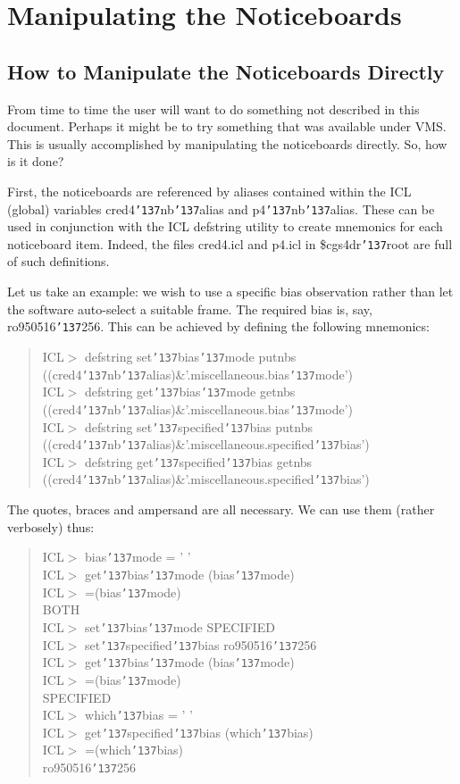 \documentclass[a4paper]{book}
\newcommand{\stardocinitials}  {SUN}
\newcommand{\stardocnumber}    {27.5}
\newcommand{\stardocname}{\stardocinitials /\stardocnumber}
\renewcommand{\_}{{\tt\char'137}}
\begin{document}
\chapter{Manipulating the Noticeboards}
\markboth{Behind the Scenes with NBS}{\stardocname}
\section{How to Manipulate the Noticeboards Directly}

From time to time the user will want to do something not described in
this document. Perhaps it might be to try something that was available
under VMS. This is usually accomplished by manipulating the
noticeboards directly.  So, how is it done?

First, the noticeboards are referenced by aliases contained within the
ICL (global) variables cred4\_nb\_alias and p4\_nb\_alias. These can be
used in conjunction with the ICL defstring utility to create mnemonics
for each noticeboard item. Indeed, the files cred4.icl and p4.icl in
{\sc \$cgs4dr\_root} are full of such definitions.

Let us take an example: we wish to use a specific {\sc bias}
observation rather than let the software auto-select a suitable frame.
The required {\sc bias} is, say, ro950516\_256. This can be achieved by
defining the following mnemonics:

\begin{quote}
 ICL$>$ defstring set\_bias\_mode putnbs ((cred4\_nb\_alias)\&'.miscellaneous.bias\_mode') \\
 ICL$>$ defstring get\_bias\_mode getnbs ((cred4\_nb\_alias)\&'.miscellaneous.bias\_mode') \\
 ICL$>$ defstring set\_specified\_bias putnbs ((cred4\_nb\_alias)\&'.miscellaneous.specified\_bias') \\
 ICL$>$ defstring get\_specified\_bias getnbs ((cred4\_nb\_alias)\&'.miscellaneous.specified\_bias')
\end{quote}

The quotes, braces and ampersand are all necessary. We can use them
(rather verbosely) thus:

\begin{quote}
 ICL$>$ bias\_mode = ' ' \\
 ICL$>$ get\_bias\_mode (bias\_mode) \\
 ICL$>$ =(bias\_mode) \\
 BOTH \\
 ICL$>$ set\_bias\_mode SPECIFIED \\
 ICL$>$ set\_specified\_bias ro950516\_256 \\
 ICL$>$ get\_bias\_mode (bias\_mode) \\
 ICL$>$ =(bias\_mode) \\
 SPECIFIED \\
 ICL$>$ which\_bias = ' ' \\
 ICL$>$ get\_specified\_bias (which\_bias) \\
 ICL$>$ =(which\_bias) \\
 ro950516\_256
\end{quote}
\end{document}

